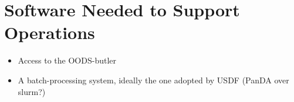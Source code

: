 \section{Software Needed to Support \CC Operations}

\begin{itemize}
\item
  Access to the OODS-butler
\item
  A batch-processing system, ideally the one adopted by USDF (PanDA over slurm?)
\end{itemize}
